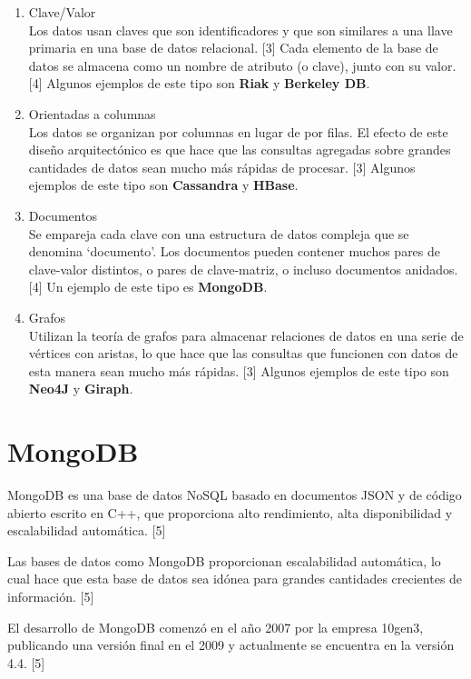 \documentclass[twocolumn]{article}
\begin{document}
\begin{enumerate}

  \item Clave/Valor \\
        Los datos usan claves que son identificadores y que son similares a una llave primaria en una base de datos relacional. [3] Cada elemento de la base de datos se almacena como un nombre de atributo (o clave), junto con su valor. [4] Algunos ejemplos de este tipo son \textbf{Riak } y \textbf{Berkeley DB}.

  \item Orientadas a columnas \\
        Los datos se organizan por columnas en lugar de por filas. El efecto de este diseño arquitectónico es que hace que las consultas agregadas sobre grandes cantidades de datos sean mucho más rápidas de procesar. [3] Algunos ejemplos de este tipo son \textbf{Cassandra} y \textbf{HBase}.

  \item Documentos \\
        Se empareja cada clave con una estructura de datos compleja que se denomina `documento'. Los documentos pueden contener muchos pares de clave-valor distintos, o pares de clave-matriz, o incluso documentos anidados. [4] Un ejemplo de este tipo es \textbf{MongoDB}.

  \item Grafos \\
        Utilizan la teoría de grafos para almacenar relaciones de datos en una serie de vértices con aristas, lo que hace que las consultas que funcionen con datos de esta manera sean mucho más rápidas. [3] Algunos ejemplos de este tipo son \textbf{Neo4J} y \textbf{Giraph}.

\end{enumerate}

\section{MongoDB}

MongoDB es una base de datos NoSQL basado en documentos JSON y de código abierto escrito en C++, que proporciona alto rendimiento, alta disponibilidad y escalabilidad automática. [5]

Las bases de datos como MongoDB proporcionan escalabilidad automática, lo cual hace que esta base de datos sea idónea para grandes cantidades crecientes de información. [5]

El desarrollo de MongoDB comenzó en el año 2007 por la empresa 10gen3, publicando una versión final en el 2009 y actualmente se encuentra en la versión 4.4. [5]
\end{document}

